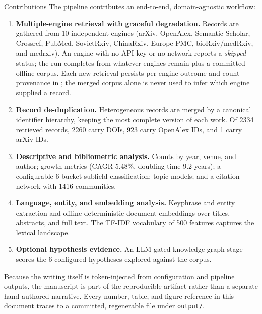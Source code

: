 \documentclass[
  ignorenonframetext,
]{beamer}
\begin{document}
\begin{frame}{Contributions}
\protect{}\label{contributions}
The pipeline contributes an end-to-end, domain-agnostic workflow:

\begin{enumerate}
\item
  \textbf{Multiple-engine retrieval with graceful degradation.} Records
  are gathered from 10 independent engines (arXiv, OpenAlex, Semantic
  Scholar, Crossref, PubMed, SovietRxiv, ChinaRxiv, Europe PMC,
  bioRxiv/medRxiv, and medrxiv). An engine with no API key or no network
  reports a \emph{skipped} status; the run completes from whatever
  engines remain plus a committed offline corpus. Each new retrieval
  persists per-engine outcome and count provenance in
  ; the merged corpus alone
  is never used to infer which engine supplied a record.
\item
  \textbf{Record de-duplication.} Heterogeneous records are merged by a
  canonical identifier hierarchy, keeping the most complete version of
  each work. Of 2334 retrieved records, 2260 carry DOIs, 923 carry
  OpenAlex IDs, and 1 carry arXiv IDs.
\item
  \textbf{Descriptive and bibliometric analysis.} Counts by year, venue,
  and author; growth metrics (CAGR 5.48\%, doubling time 9.2 years); a
  configurable 6-bucket subfield classification; topic models; and a
  citation network with 1416 communities.
\item
  \textbf{Language, entity, and embedding analysis.} Keyphrase and
  entity extraction and offline deterministic document embeddings over
  titles, abstracts, and full text. The TF-IDF vocabulary of 500
  features captures the lexical landscape.
\item
  \textbf{Optional hypothesis evidence.} An LLM-gated knowledge-graph
  stage scores the 6 configured hypotheses explored against the corpus.
\end{enumerate}

Because the writing itself is token-injected from configuration and
pipeline outputs, the manuscript is part of the reproducible artifact
rather than a separate hand-authored narrative. Every number, table, and
figure reference in this document traces to a committed, regenerable
file under \texttt{output/}.
\end{frame}
\end{document}
